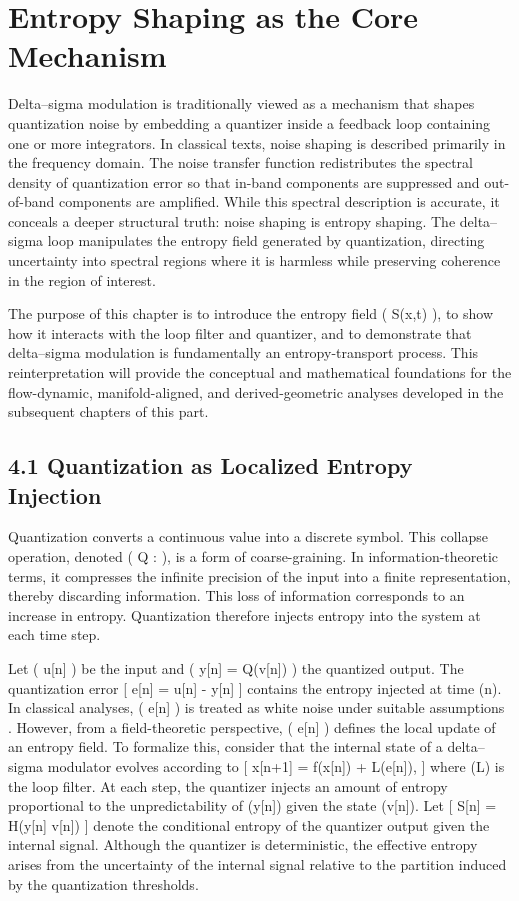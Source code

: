 \chapter{Entropy Shaping as the Core Mechanism}

Delta--sigma modulation is traditionally viewed as a mechanism that shapes quantization noise by embedding a quantizer inside a feedback loop containing one or more integrators. In classical texts, noise shaping is described primarily in the frequency domain. The noise transfer function redistributes the spectral density of quantization error so that in-band components are suppressed and out-of-band components are amplified. While this spectral description is accurate, it conceals a deeper structural truth: noise shaping is entropy shaping. The delta--sigma loop manipulates the entropy field generated by quantization, directing uncertainty into spectral regions where it is harmless while preserving coherence in the region of interest.

The purpose of this chapter is to introduce the entropy field ( S(x,t) ), to show how it interacts with the loop filter and quantizer, and to demonstrate that delta--sigma modulation is fundamentally an entropy-transport process. This reinterpretation will provide the conceptual and mathematical foundations for the flow-dynamic, manifold-aligned, and derived-geometric analyses developed in the subsequent chapters of this part.

\section*{4.1 Quantization as Localized Entropy Injection}

Quantization converts a continuous value into a discrete symbol. This collapse operation, denoted ( Q :  \to \Lambda ), is a form of coarse-graining. In information-theoretic terms, it compresses the infinite precision of the input into a finite representation, thereby discarding information. This loss of information corresponds to an increase in entropy. Quantization therefore injects entropy into the system at each time step.

Let ( u[n] ) be the input and ( y[n] = Q(v[n]) ) the quantized output. The quantization error
[
e[n] = u[n] - y[n]
]
contains the entropy injected at time (n). In classical analyses, ( e[n] ) is treated as white noise under suitable assumptions \citep{widrow1956statistical}. However, from a field-theoretic perspective, ( e[n] ) defines the local update of an entropy field. To formalize this, consider that the internal state of a delta--sigma modulator evolves according to
[
x[n+1] = f(x[n]) + L(e[n]),
]
where (L) is the loop filter. At each step, the quantizer injects an amount of entropy proportional to the unpredictability of (y[n]) given the state (v[n]). Let
[
S[n] = H(y[n] \mid v[n])
]
denote the conditional entropy of the quantizer output given the internal signal. Although the quantizer is deterministic, the effective entropy arises from the uncertainty of the internal signal relative to the partition induced by the quantization thresholds.

